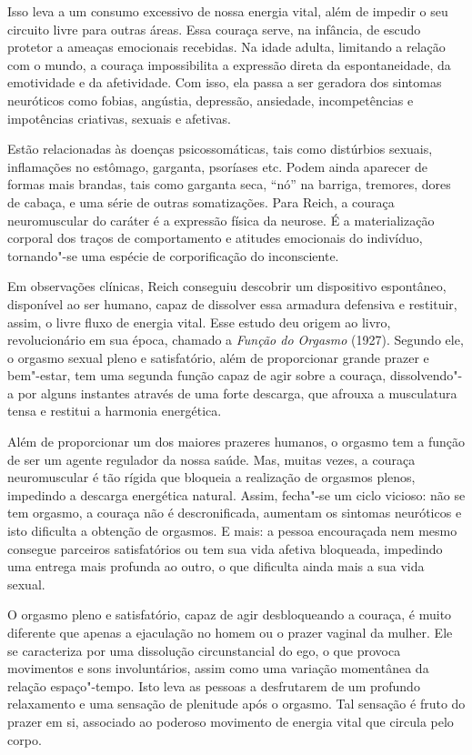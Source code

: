 Isso leva a um consumo excessivo de nossa energia vital, além de impedir
o seu circuito livre para outras áreas. Essa couraça serve, na infância,
de escudo protetor a ameaças emocionais recebidas. Na idade adulta,
limitando a relação com o mundo, a couraça impossibilita a expressão
direta da espontaneidade, da emotividade e da afetividade. Com isso, ela
passa a ser geradora dos sintomas neuróticos como fobias, angústia,
depressão, ansiedade, incompetências e impotências criativas, sexuais e
afetivas.

Estão relacionadas às doenças psicossomáticas, tais como distúrbios
sexuais, inflamações no estômago, garganta, psoríases etc. Podem ainda
aparecer de formas mais brandas, tais como garganta seca, ``nó'' na
barriga, tremores, dores de cabaça, e uma série de outras somatizações.
Para Reich, a couraça neuromuscular do caráter é a expressão física da
neurose. É a materialização corporal dos traços de comportamento e
atitudes emocionais do indivíduo, tornando"-se uma espécie de
corporificação do inconsciente.

Em observações clínicas, Reich conseguiu descobrir um dispositivo
espontâneo, disponível ao ser humano, capaz de dissolver essa armadura
defensiva e restituir, assim, o livre fluxo de energia vital. Esse
estudo deu origem ao livro, revolucionário em sua época, chamado a
\emph{Função do Orgasmo} (1927). Segundo ele, o orgasmo sexual pleno e
satisfatório, além de proporcionar grande prazer e bem"-estar, tem uma
segunda função capaz de agir sobre a couraça, dissolvendo"-a por alguns
instantes através de uma forte descarga, que afrouxa a musculatura tensa
e restitui a harmonia energética.

Além de proporcionar um dos maiores prazeres humanos, o orgasmo tem a
função de ser um agente regulador da nossa saúde. Mas, muitas vezes, a
couraça neuromuscular é tão rígida que bloqueia a realização de orgasmos
plenos, impedindo a descarga energética natural. Assim, fecha"-se um
ciclo vicioso: não se tem orgasmo, a couraça não é descronificada,
aumentam os sintomas neuróticos e isto dificulta a obtenção de orgasmos.
E mais: a pessoa encouraçada nem mesmo consegue parceiros satisfatórios
ou tem sua vida afetiva bloqueada, impedindo uma entrega mais profunda
ao outro, o que dificulta ainda mais a sua vida sexual.

O orgasmo pleno e satisfatório, capaz de agir desbloqueando a couraça, é
muito diferente que apenas a ejaculação no homem ou o prazer vaginal da
mulher. Ele se caracteriza por uma dissolução circunstancial do ego, o
que provoca movimentos e sons involuntários, assim como uma variação
momentânea da relação espaço"-tempo. Isto leva as pessoas a desfrutarem
de um profundo relaxamento e uma sensação de plenitude após o orgasmo.
Tal sensação é fruto do prazer em si, associado ao poderoso movimento %
de energia vital que circula pelo corpo.

